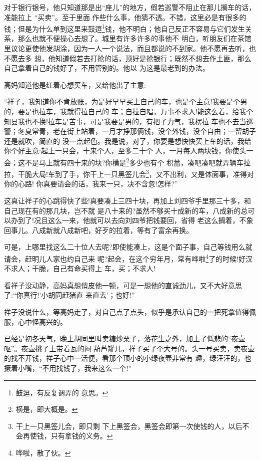 \documentclass[11pt,a4paper,onecolumn]{article}
\begin{document}
对于银行银号，他只知道那是出``座儿''的地方，假若巡警不阻止在那儿搁车的话，准能拉上 ``买卖''。至于里面
作些什么事，他猜不透。不错，这里必是有很多的钱；但是为什么单到这里来鼓逗\footnote{鼓逗，有反复调弄的
  意思。}钱，他不明白；他自己反正不容易与它们发生关系，那么也就不便操心去想了。城里有许多许多的事他不
明白，听朋友们在茶馆里议论更使他发胡涂，因为一人一个说法，而且都说的不到家。他不愿再去听，也不愿去多
想，他知道假若去打抢的话，顶好是抢银行；既然不想去作土匪，那么自己拿着自己的钱好了，不用管别的。他以
为这是最老到的办法。

高妈知道他是红着心想买车，又给他出了主意:

``祥子，我知道你不肯放账，为是好早早买上自己的车，也是个主意!我要是个男的，要是也拉车，我就得拉自己的
车；自拉自唱，万事不求人!能这么着，给我个知县我也不换!拉车是苦事，可是我要是男的，有把子力气，我楞拉
车也不去当巡警；冬夏常青，老在街上站着，一月才挣那俩钱，没个外钱，没个自由；一留胡子还是就吹，简直的
没一点起色。我是说，对了，你要是想快快买上车的话，我给你个好主意:起上一只会，十来个人，至多二十个
人，一月每人两块钱，你使头一会；这不是马上就有四十来的块?你横是\footnote{横是，即大概是。}多少也有个
积蓄，凑吧凑吧就弄辆车拉拉，干脆大局!车到了手，你干上一只黑签儿会\footnote{干上一只黑签儿会，即只剩
  下上黑签会，黑签会即第一次使钱的人，以后不会再使钱，只有拿钱的义务。}，又不出利，又是体面事，准得对
你的心路! 你真要请会的话，我来一只，决不含忽!怎样?''

这真让祥子的心跳得快了些!真要凑上三四十块，再加上刘四爷手里那三十多，和自己现在有的那几块，岂不就
是八十来的?虽然不够买十成新的车，八成新的总可以办到了!况且这么一来，他就可以去向刘四爷把钱要回，省得
老这么搁着，不象回事儿。八成新就八成新吧，好歹的拉着，等有了富余再换。

可是，上哪里找这么二十位人去呢?即使能凑上，这是个面子事，自己等钱用么就请会，赶明儿人家也约自己来
呢?起会，在这个穷年月，常有哗啦\footnote{哗啦，散了伙。}了的时候!好汉不求人；干脆，自己有命买得上
车，买；不求人!

看祥子没动静，高妈真想俏皮他一顿，可是一想他的直诚劲儿，又不大好意思了:``你真行!'小胡同赶猪\myrule 直
来直去'；也好!''

祥子没说什么，等高妈走了，对自己点了点头，似乎是承认自己的一把死拿值得佩服，心中怪高兴的。

已经是初冬天气，晚上胡同里叫卖糖炒栗子，落花生之外，加上了低悲的``夜壶呕''。夜壶挑子上带着瓦的闷
葫芦罐儿，祥子买了个大号的。头一号买卖，卖夜壶的找不开钱，祥子心中一活便，看那个顶小的小绿夜壶非常有
趣，绿汪汪的，也撅着小嘴，``不用找钱了，我来这么一个!''
\end{document}
